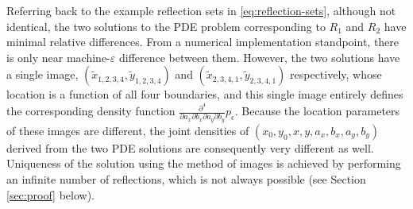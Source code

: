 Referring back to the example reflection sets in
\eqref{eq:reflection-sets}, although not identical, the two solutions
to the PDE problem corresponding to $R_1$ and $R_2$ have minimal
relative differences. From a numerical implementation standpoint, there is only
near machine-$\varepsilon$ difference between them. However, the two
solutions have a single image,
$(\tilde{x}_{1,2,3,4}, \tilde{y}_{1,2,3,4})$ and
$(\tilde{x}_{2,3,4,1}, \tilde{y}_{2,3,4,1})$ respectively, whose
location is a function of all four boundaries, and this single image
entirely defines the corresponding density function
$\frac{\partial^4}{\partial a_x \partial b_x \partial a_y
  \partial b_y}p_\epsilon$. Because the location parameters of these images are
different, the joint densities of $(x_0, y_0, x, y, a_x, b_x, a_y, b_y)$
derived from the two PDE solutions are consequently very different as
well. Uniqueness of the solution using the method of images is
achieved by performing an infinite number of reflections, which is not
always possible (see Section \ref{sec:proof} below).

